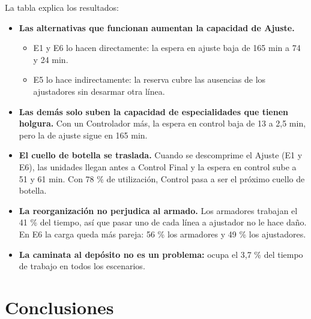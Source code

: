\documentclass[11pt,a4paper]{article}
\begin{document}
La tabla explica los resultados:

\begin{itemize}
\item \textbf{Las alternativas que funcionan aumentan la capacidad de Ajuste.}
\begin{itemize}
\item E1 y E6 lo hacen directamente: la espera en ajuste baja de 165 min a 74 y 24 min.
\item E5 lo hace indirectamente: la reserva cubre las ausencias de los ajustadores sin desarmar otra línea.
\end{itemize}
\item \textbf{Las demás solo suben la capacidad de especialidades que tienen holgura.} Con un Controlador más, la espera en control baja de 13 a 2,5 min, pero la de ajuste sigue en 165 min.
\item \textbf{El cuello de botella se traslada.} Cuando se descomprime el Ajuste (E1 y E6), las unidades llegan antes a Control Final y la espera en control sube a 51 y 61 min. Con 78 \% de utilización, Control pasa a ser el próximo cuello de botella.
\item \textbf{La reorganización no perjudica al armado.} Los armadores trabajan el 41 \% del tiempo, así que pasar uno de cada línea a ajustador no le hace daño. En E6 la carga queda más pareja: 56 \% los armadores y 49 \% los ajustadores.
\item \textbf{La caminata al depósito no es un problema:} ocupa el 3,7 \% del tiempo de trabajo en todos los escenarios.
\end{itemize}

\section{Conclusiones}
\end{document}
